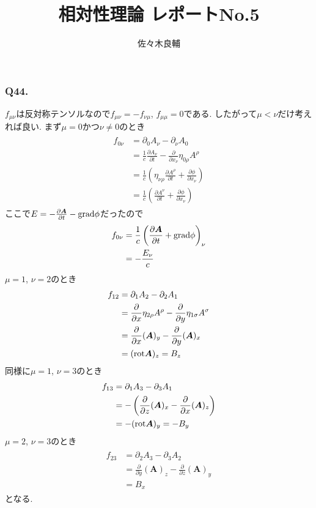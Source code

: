 \documentclass[uplatex,a4j,11pt,dvipdfmx]{jsarticle}
\begin{document}
\title{相対性理論 レポートNo.5}
\author{佐々木良輔}
\date{}
\maketitle
\subsubsection*{Q44.}
$f_{\mu\nu}$は反対称テンソルなので$f_{\mu\nu}=-f_{\nu\mu}$, $f_{\mu\mu}=0$である.
したがって$\mu<\nu$だけ考えれば良い.
まず$\mu=0$かつ$\nu\neq 0$のとき
\begin{align}
  \begin{split}
    f_{0\nu}&=\partial_0A_\nu-\partial_\nu A_0\\
    &=\frac{1}{c}\frac{\partial A_\nu}{\partial t}-\frac{\partial }{\partial x_\nu}\eta_{0\rho}A^\rho\\
    &=\frac{1}{c}\left(\eta_{\nu\rho}\frac{\partial A^\rho}{\partial t}+\frac{\partial \phi}{\partial x_\nu}\right)\\
    &=\frac{1}{c}\left(\frac{\partial A^\nu}{\partial t}+\frac{\partial \phi}{\partial x_\nu}\right)
  \end{split}
\end{align}
ここで$E=-\frac{\partial {\bm A}}{\partial t}-{\rm grad}\phi$だったので
\begin{align}
  \begin{split}
    f_{0\nu}&=\frac{1}{c}\left(\frac{\partial {\bm A}}{\partial t}+{\rm grad}\phi\right)_\nu\\
    &=-\frac{E_\nu}{c}
  \end{split}
\end{align}
$\mu=1$, $\nu=2$のとき
\begin{align}
  \begin{split}
    f_{12}&=\partial_1A_2-\partial_2A_1\\
    &=\frac{\partial}{\partial x}\eta_{2\rho}A^\rho-\frac{\partial}{\partial y}\eta_{1\sigma}A^\sigma\\
    &=\frac{\partial}{\partial x}({\bm A})_y-\frac{\partial}{\partial y}({\bm A})_x\\
    &=({\rm rot}{\bm A})_z=B_z
  \end{split}
\end{align}
同様に$\mu=1$, $\nu=3$のとき
\begin{align}
  \begin{split}
    f_{13}&=\partial_1A_3-\partial_3A_1\\
    &=-\left(\frac{\partial}{\partial z}({\bm A})_x-\frac{\partial}{\partial x}({\bm A})_z\right)\\
    &=-({\rm rot}{\bm A})_y=-B_y
  \end{split}
\end{align}
$\mu=2$, $\nu=3$のとき
\begin{align}
  \begin{split}
    f_{23}&=\partial_2A_3-\partial_3A_2\\
    &=\frac{\partial}{\partial y}({\bm A})_z-\frac{\partial}{\partial z}({\bm A})_y\\
    &=B_x
  \end{split}
\end{align}
となる.
\end{document}
